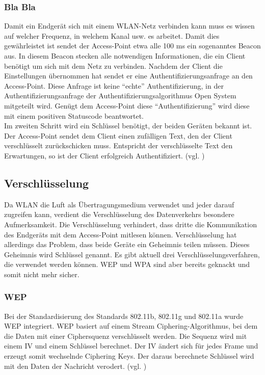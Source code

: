 \subsubsection{Bla Bla}
Damit ein Endgerät sich mit einem WLAN-Netz verbinden kann muss es wissen auf welcher Frequenz, in welchem Kanal usw. es arbeitet. Damit dies gewährleistet ist sendet der Access-Point etwa alle 100 ms ein sogenanntes Beacon aus. In diesem Beacon stecken alle notwendigen Informationen, die ein Client benötigt um sich mit dem Netz zu verbinden. Nachdem der Client die Einstellungen übernommen hat sendet er eine Authentifizierungsanfrage an den Access-Point. Diese Anfrage ist keine "`echte"' Authentifizierung, in der Authentifizierungsanfrage der Authentifizierungsalgorithmus Open System mitgeteilt wird. Genügt dem Access-Point diese "`Authentifizierung"' wird diese mit einem positiven Statuscode beantwortet.\\
Im zweiten Schritt wird ein Schlüssel benötigt, der beiden Geräten bekannt ist. Der Access-Point sendet dem Client einen zufälligen Text, den der Client verschlüsselt zurückschicken muss. Entspricht der verschlüsselte Text den Erwartungen, so ist der Client erfolgreich Authentifiziert. (vgl. \cite{SWB-430171331})



\subsection{Verschlüsselung}

Da WLAN die Luft als Übertragungsmedium verwendet und jeder darauf zugreifen kann, verdient die Verschlüsselung des Datenverkehrs besondere Aufmerksamkeit. Die Verschlüsselung verhindert, dass dritte die Kommunikation des Endgeräts mit dem Access-Point mitlesen können. Verschlüsselung hat allerdings das Problem, dass beide Geräte ein Geheimnis teilen müssen. Dieses Geheimnis wird Schlüssel genannt. Es gibt aktuell drei Verschlüsselungsverfahren, die verwendet werden können. \ac{WEP} und \ac{WPA} sind aber bereits geknackt und somit nicht mehr sicher.

\subsubsection{\ac{WEP}}
Bei der Standardisierung des Standards 802.11b, 802.11g und 802.11a wurde \ac{WEP} integriert. \ac{WEP} basiert auf einem Stream Ciphering-Algorithmus, bei dem die Daten mit einer Ciphersquenz verschlüsselt werden. Die Sequenz wird mit einem \ac{IV} und einem Schlüssel berechnet. Der \ac{IV} ändert sich für jedes Frame und erzeugt somit wechselnde Ciphering Keys. Der daraus berechnete Schlüssel wird mit den Daten der Nachricht verodert. (vgl. \cite{SWB-430171331})


